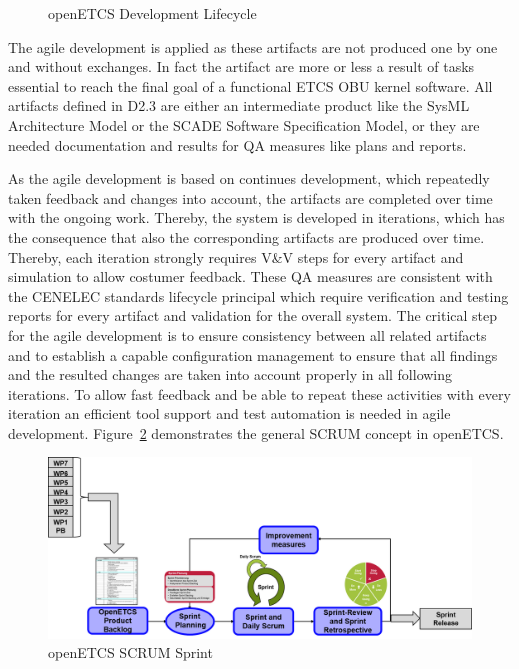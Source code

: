 \begin{figure}[hbt]
  \centering
  \def\svgwidth{.9\textwidth}
  {\tiny
  }
  \caption{openETCS Development Lifecycle}
  \label{fig:lifecycle2}
\end{figure}


The agile development is applied as these artifacts are not produced one by one and without exchanges. In fact the artifact are more or less a result of tasks essential to reach the final goal of a functional ETCS OBU kernel software. All artifacts defined in D2.3 are either an intermediate product like the SysML Architecture Model or the SCADE Software Specification Model, or they are needed documentation and results for QA measures like plans and reports.

As the agile development is based on continues development, which repeatedly taken feedback and changes into account, the artifacts are completed over time with the ongoing work. Thereby, the system is developed in iterations, which has the consequence that also the corresponding artifacts are produced over time. Thereby, each iteration strongly requires V\&V steps for every artifact and simulation to allow costumer feedback. These QA measures are consistent with the CENELEC standards lifecycle principal which require verification and testing reports for every artifact and validation for the overall system. The critical step for the agile development is to ensure consistency between all related artifacts and to establish a capable configuration management to ensure that all findings and the resulted changes are taken into account properly in all following iterations. To allow fast feedback and be able to repeat these activities with every iteration an efficient tool support and test automation is needed in agile development. Figure~\ref{fig:openETCSSCRUMSprint} demonstrates the general SCRUM concept in openETCS.

\begin{figure}[hbt]
\centering
\includegraphics[width=0.95\linewidth]{./images/openETCSoverallScrum}
\caption{openETCS SCRUM Sprint}
\label{fig:openETCSSCRUMSprint}
\end{figure}

